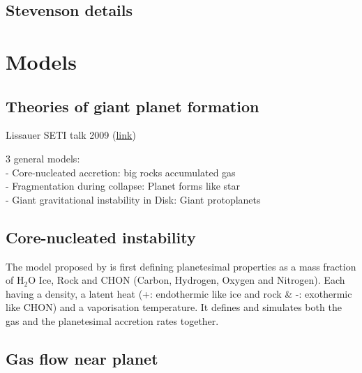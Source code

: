 \documentclass[12pt]{article} %
\begin{document}
\subsection{Stevenson details}\vspace{-1ex}\bigskip

\cite{stevenson1982formation}


\section{Models}\vspace{-2ex}\titlerule[1pt]\bigskip

\subsection{Theories of giant planet formation}\vspace{-1ex}\bigskip

Lissauer SETI talk 2009 (\href{https://www.youtube.com/watch?v=FAa7hb2bT\_g}{link})\newline 

3 general models: \\
- Core-nucleated accretion: big rocks accumulated gas\\
- Fragmentation during collapse: Planet forms like star\\
- Giant gravitational instability in Disk: Giant protoplanets\\

\subsection{Core-nucleated instability}\vspace{-1ex}\bigskip

\noindent The model proposed by \cite{pollack1996formation} is first defining planetesimal properties as a mass fraction of H$_2$O Ice, Rock and CHON (Carbon, Hydrogen, Oxygen and Nitrogen). Each having a density, a latent heat (+: endothermic like ice and rock \& -: exothermic like CHON) and a vaporisation temperature. It defines and simulates both the gas and the planetesimal accretion rates together. \newline

\subsection{Gas flow near planet}\vspace{-1ex}\bigskip
\end{document}
